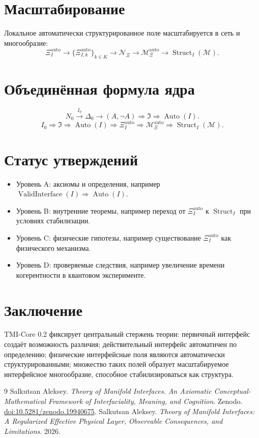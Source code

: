 \documentclass[12pt,a4paper]{article}
\DeclareMathOperator{\Valid}{ValidInterface}
\DeclareMathOperator{\Auto}{Auto}
\DeclareMathOperator{\Struct}{Struct}
\newcommand{\M}{\mathcal M}
\newcommand{\Ispace}{\mathfrak I}
\newcommand{\XiAuto}{\Xi_I^{\mathrm{auto}}}
\newcommand{\XiMan}{\mathcal M_{\Xi}^{\mathrm{auto}}}
\newcommand{\NXi}{\mathcal N_{\Xi}}
\begin{document}
\section{Масштабирование}
Локальное автоматически структурированное поле масштабируется в сеть и многообразие:
\begin{equation}
\boxed{\XiAuto\to\{\Xi_{I,k}^{\mathrm{auto}}\}_{k\in K}\to\NXi\to\XiMan\to\Struct_I(\M).}
\end{equation}

\section{Объединённая формула ядра}
\begin{equation}
\boxed{N_0\xrightarrow{I_0}\Delta_0\to(A,\neg A)\Rightarrow\Ispace\Rightarrow\Auto(I).}
\end{equation}
\begin{equation}
\boxed{I_0\Rightarrow\Ispace\Rightarrow\Auto(I)\Rightarrow\XiAuto\Rightarrow\XiMan\Rightarrow\Struct_I(\M).}
\end{equation}

\section{Статус утверждений}
\begin{itemize}
\item Уровень A: аксиомы и определения, например \(\Valid(I)\Rightarrow\Auto(I)\).
\item Уровень B: внутренние теоремы, например переход от \(\XiAuto\) к \(\Struct_I\) при условиях стабилизации.
\item Уровень C: физические гипотезы, например существование \(\XiAuto\) как физического механизма.
\item Уровень D: проверяемые следствия, например увеличение времени когерентности в квантовом эксперименте.
\end{itemize}

\section{Заключение}
TMI-Core 0.2 фиксирует центральный стержень теории: первичный интерфейс создаёт возможность различия; действительный интерфейс автоматичен по определению; физические интерфейсные поля являются автоматически структурированными; множество таких полей образует масштабируемое интерфейсное многообразие, способное стабилизироваться как структура.

\begin{thebibliography}{9}
 Salkutsan Aleksey. \textit{Theory of Manifold Interfaces. An Axiomatic Conceptual-Mathematical Framework of Interfaciality, Meaning, and Cognition}. Zenodo. \href{https://doi.org/10.5281/zenodo.19940675}{doi:10.5281/zenodo.19940675}.
 Salkutsan Aleksey. \textit{Theory of Manifold Interfaces: A Regularized Effective Physical Layer, Observable Consequences, and Limitations}. 2026.
\end{thebibliography}
\end{document}
